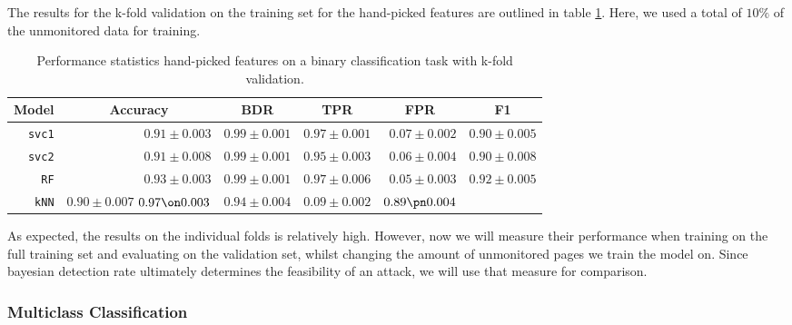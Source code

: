 The results for the k-fold validation on the training set for the hand-picked features are outlined in table \ref{table:hand-picked-bin}.
Here, we used a total of $10\%$ of the unmonitored data for training.

\begin{table}[ht]
  \centering
  \begin{tabular}{ r  r  r  r  r  r } \hline
    \multicolumn{1}{c}{\textbf{Model}} & \multicolumn{1}{c}{\textbf{Accuracy}} & \multicolumn{1}{c}{\textbf{BDR}} & \multicolumn{1}{c}{\textbf{TPR}} &
      \multicolumn{1}{c}{\textbf{FPR}} & \multicolumn{1}{c}{\textbf{F1}} \\ \hline

    \texttt{svc1} & $0.91 \pm 0.003$ & $0.99 \pm 0.001$ & $0.97 \pm 0.001$ & $0.07 \pm 0.002$ & $0.90 \pm 0.005$ \\

    \texttt{svc2} & $0.91 \pm 0.008$ & $0.99 \pm 0.001$ & $0.95 \pm 0.003$ & $0.06 \pm 0.004$ & $0.90 \pm 0.008$ \\

    \texttt{RF} & $0.93 \pm 0.003$ & $0.99 \pm 0.001$ & $0.97 \pm 0.006$ & $0.05 \pm 0.003$ & $0.92 \pm 0.005$ \\

    \texttt{kNN} & $0.90 \pm 0.007$ $0.97 \on 0.003$ & $0.94 \pm 0.004$ & $0.09 \pm 0.002$ & $0.89 \pn 0.004$ & \\

    \hline
  \end{tabular}
  \caption{Performance statistics hand-picked features on a binary classification task with k-fold validation.} %
  \label{table:hand-picked-bin}
\end{table}

As expected, the results on the individual folds is relatively high.
However, now we will measure their performance when training on the full training set and evaluating on the validation set, whilst changing the amount of unmonitored pages we train the model on.
Since bayesian detection rate ultimately determines the feasibility of an attack, we will use that measure for comparison.


\subsubsection{Multiclass Classification}


